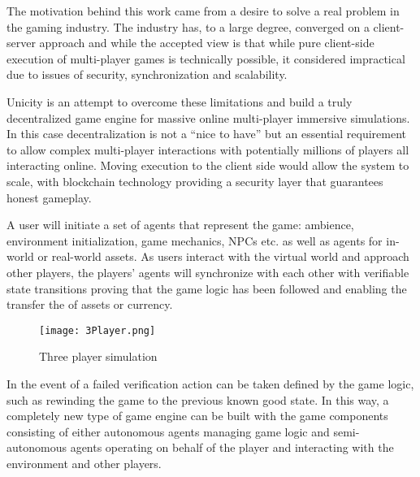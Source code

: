 \documentclass{article}
\begin{document}
\vspace{2mm} 
The motivation behind this work came from a desire to solve a real problem in the gaming industry. The industry has, to a large degree, converged on a client-server approach and while the accepted view is that while pure client-side execution of multi-player games is technically possible, it considered impractical due to issues of security, synchronization and scalability. 
\vspace{2mm}

Unicity is an attempt to overcome these limitations and build a truly decentralized game engine for massive online multi-player immersive simulations. In this case decentralization is not a “nice to have” but an essential requirement to allow complex multi-player interactions with potentially millions of players all interacting online. Moving execution to the client side would allow the system to scale, with blockchain technology providing a security layer that guarantees honest gameplay. 

\vspace{2mm}
A user will initiate a set of agents that represent the game: ambience, environment initialization, game mechanics, NPCs etc. as well as agents for in-world or real-world assets. As users interact with the virtual world and approach other players, the players' agents will synchronize with each other with verifiable state transitions proving that the game logic has been followed and enabling the transfer the of assets or currency. 

\begin{figure}[H]
    \centering
    \texttt{[image: 3Player.png]}
    \caption{Three player simulation}
    \label{fig:Threeplayer}
\end{figure}

In the event of a failed verification action can be taken defined by the game logic, such as rewinding the game to the previous known good state. In this way, a completely new type of game engine can be built with the game components consisting of either autonomous agents managing game logic and semi-autonomous agents operating on behalf of the player and interacting with the environment and other players.
\end{document}
